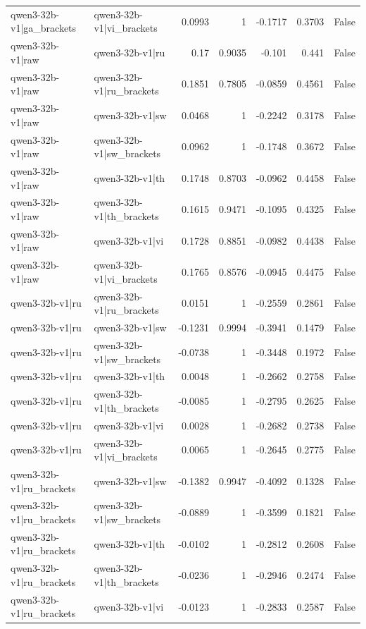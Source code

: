 \begin{table}
\begin{tabular}{l l r r r r l}
qwen3-32b-v1|ga_brackets & qwen3-32b-v1|vi_brackets & 0.0993 & 1 & -0.1717 & 0.3703 & False \\
qwen3-32b-v1|raw & qwen3-32b-v1|ru & 0.17 & 0.9035 & -0.101 & 0.441 & False \\
qwen3-32b-v1|raw & qwen3-32b-v1|ru_brackets & 0.1851 & 0.7805 & -0.0859 & 0.4561 & False \\
qwen3-32b-v1|raw & qwen3-32b-v1|sw & 0.0468 & 1 & -0.2242 & 0.3178 & False \\
qwen3-32b-v1|raw & qwen3-32b-v1|sw_brackets & 0.0962 & 1 & -0.1748 & 0.3672 & False \\
qwen3-32b-v1|raw & qwen3-32b-v1|th & 0.1748 & 0.8703 & -0.0962 & 0.4458 & False \\
qwen3-32b-v1|raw & qwen3-32b-v1|th_brackets & 0.1615 & 0.9471 & -0.1095 & 0.4325 & False \\
qwen3-32b-v1|raw & qwen3-32b-v1|vi & 0.1728 & 0.8851 & -0.0982 & 0.4438 & False \\
qwen3-32b-v1|raw & qwen3-32b-v1|vi_brackets & 0.1765 & 0.8576 & -0.0945 & 0.4475 & False \\
qwen3-32b-v1|ru & qwen3-32b-v1|ru_brackets & 0.0151 & 1 & -0.2559 & 0.2861 & False \\
qwen3-32b-v1|ru & qwen3-32b-v1|sw & -0.1231 & 0.9994 & -0.3941 & 0.1479 & False \\
qwen3-32b-v1|ru & qwen3-32b-v1|sw_brackets & -0.0738 & 1 & -0.3448 & 0.1972 & False \\
qwen3-32b-v1|ru & qwen3-32b-v1|th & 0.0048 & 1 & -0.2662 & 0.2758 & False \\
qwen3-32b-v1|ru & qwen3-32b-v1|th_brackets & -0.0085 & 1 & -0.2795 & 0.2625 & False \\
qwen3-32b-v1|ru & qwen3-32b-v1|vi & 0.0028 & 1 & -0.2682 & 0.2738 & False \\
qwen3-32b-v1|ru & qwen3-32b-v1|vi_brackets & 0.0065 & 1 & -0.2645 & 0.2775 & False \\
qwen3-32b-v1|ru_brackets & qwen3-32b-v1|sw & -0.1382 & 0.9947 & -0.4092 & 0.1328 & False \\
qwen3-32b-v1|ru_brackets & qwen3-32b-v1|sw_brackets & -0.0889 & 1 & -0.3599 & 0.1821 & False \\
qwen3-32b-v1|ru_brackets & qwen3-32b-v1|th & -0.0102 & 1 & -0.2812 & 0.2608 & False \\
qwen3-32b-v1|ru_brackets & qwen3-32b-v1|th_brackets & -0.0236 & 1 & -0.2946 & 0.2474 & False \\
qwen3-32b-v1|ru_brackets & qwen3-32b-v1|vi & -0.0123 & 1 & -0.2833 & 0.2587 & False \\

\end{tabular}
\end{table}
